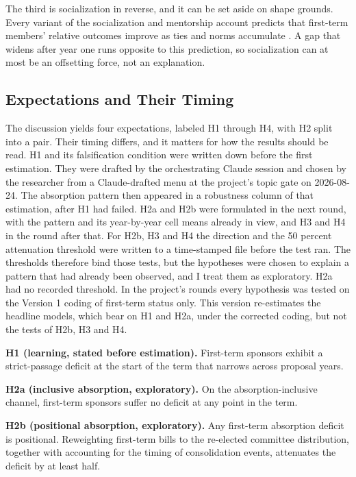 \documentclass[11pt]{article}
\begin{document}
The third is socialization in reverse, and it can be set aside on shape grounds. Every variant of the socialization and mentorship account predicts that first-term members' relative outcomes improve as ties and norms accumulate \citep{asher1973}. A gap that widens after year one runs opposite to this prediction, so socialization can at most be an offsetting force, not an explanation.

\subsection{Expectations and Their Timing}
\label{sec:expectations}

The discussion yields four expectations, labeled H1 through H4, with H2 split into a pair. Their timing differs, and it matters for how the results should be read. H1 and its falsification condition were written down before the first estimation. They were drafted by the orchestrating Claude session and chosen by the researcher from a Claude-drafted menu at the project's topic gate on 2026-08-24. The absorption pattern then appeared in a robustness column of that estimation, after H1 had failed. H2a and H2b were formulated in the next round, with the pattern and its year-by-year cell means already in view, and H3 and H4 in the round after that. For H2b, H3 and H4 the direction and the 50 percent attenuation threshold were written to a time-stamped file before the test ran. The thresholds therefore bind those tests, but the hypotheses were chosen to explain a pattern that had already been observed, and I treat them as exploratory. H2a had no recorded threshold. In the project's rounds every hypothesis was tested on the Version 1 coding of first-term status only. This version re-estimates the headline models, which bear on H1 and H2a, under the corrected coding, but not the tests of H2b, H3 and H4.

\textbf{H1 (learning, stated before estimation).} First-term sponsors exhibit a strict-passage deficit at the start of the term that narrows across proposal years.

\textbf{H2a (inclusive absorption, exploratory).} On the absorption-inclusive channel, first-term sponsors suffer no deficit at any point in the term.

\textbf{H2b (positional absorption, exploratory).} Any first-term absorption deficit is positional. Reweighting first-term bills to the re-elected committee distribution, together with accounting for the timing of consolidation events, attenuates the deficit by at least half.
\end{document}
